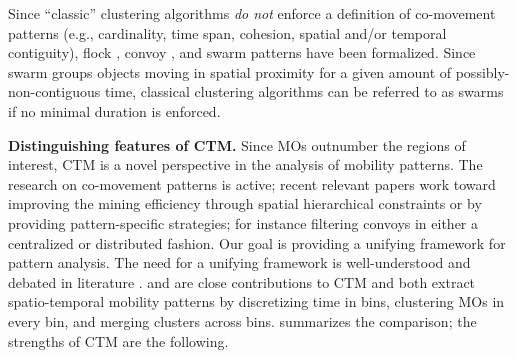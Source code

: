 \documentclass[
]{ceurart}
\begin{document}
Since ``classic'' clustering algorithms \textit{do not} enforce a definition of co-movement patterns (e.g., cardinality, time span, cohesion, spatial and/or temporal contiguity), flock \citep{DBLP:conf/gis/GudmundssonK06}, convoy \citep{DBLP:journals/pvldb/JeungYZJS08}, and swarm \citep{DBLP:conf/ssdbm/AungT10} patterns have been formalized.
Since swarm \citep{DBLP:conf/ssdbm/AungT10} groups objects moving in spatial proximity for a given amount of possibly-non-contiguous time,
classical clustering algorithms can be referred to as swarms if no minimal duration is enforced.

\textbf{Distinguishing features of CTM.}
Since MOs outnumber the regions of interest, CTM is a novel perspective in the analysis of mobility patterns.
The research on co-movement patterns is active;
recent relevant papers work toward improving the mining efficiency through spatial hierarchical constraints \citep{helmi2020multiscale} or by providing pattern-specific strategies; for instance filtering convoys in either a centralized \citep{DBLP:conf/ssdbm/AungT10,DBLP:journals/pvldb/OrakzaiCP19,DBLP:conf/cikm/Liu0LLYW21} or distributed \citep{DBLP:journals/geoinformatica/OrakzaiPC21,tritsarolis2022predicting} fashion.
Our goal is providing a unifying framework for pattern analysis.
The need for a unifying framework is well-understood and debated in literature \citep{DBLP:journals/pvldb/DingCGJB18,DBLP:journals/jdwm/Kwakye20}.
\cite{DBLP:journals/ijitdm/PhanPT16} and \cite{DBLP:journals/pvldb/FanZWT16} are close contributions to CTM and both extract spatio-temporal mobility patterns by discretizing time in bins, clustering MOs in every bin, and merging clusters across bins.
 summarizes the comparison; the strengths of CTM are the following.
\end{document}
